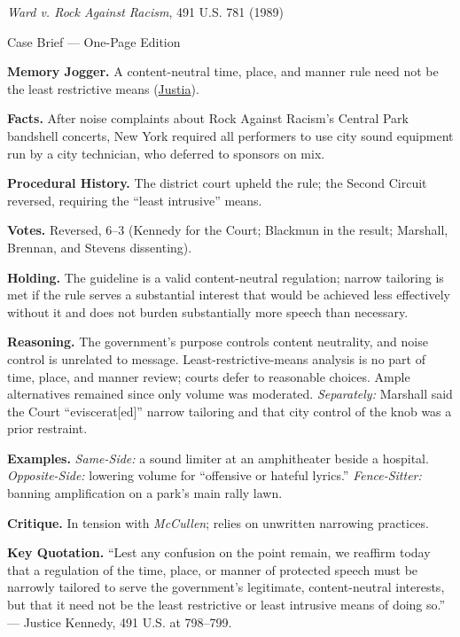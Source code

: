 \documentclass[12pt]{article}
\begin{document}
\begin{center}
{\Large \textit{Ward v. Rock Against Racism}, 491 U.S. 781 (1989)\par}
\vspace{0.3em}
{\normalsize Case Brief --- One-Page Edition\par}
\end{center}

\textbf{Memory Jogger.} A content-neutral time, place, and manner rule need not be the least restrictive means (\href{https://supreme.justia.com/cases/federal/us/491/781/}{Justia}).

\textbf{Facts.} After noise complaints about Rock Against Racism's Central Park bandshell concerts, New York required all performers to use city sound equipment run by a city technician, who deferred to sponsors on mix.

\textbf{Procedural History.} The district court upheld the rule; the Second Circuit reversed, requiring the ``least intrusive'' means.

\textbf{Votes.} Reversed, 6--3 (Kennedy for the Court; Blackmun in the result; Marshall, Brennan, and Stevens dissenting).

\textbf{Holding.} The guideline is a valid content-neutral regulation; narrow tailoring is met if the rule serves a substantial interest that would be achieved less effectively without it and does not burden substantially more speech than necessary.

\textbf{Reasoning.} The government's purpose controls content neutrality, and noise control is unrelated to message. Least-restrictive-means analysis is no part of time, place, and manner review; courts defer to reasonable choices. Ample alternatives remained since only volume was moderated. \emph{Separately:} Marshall said the Court ``eviscerat[ed]'' narrow tailoring and that city control of the knob was a prior restraint.

\textbf{Examples.} \emph{Same-Side:} a sound limiter at an amphitheater beside a hospital. \emph{Opposite-Side:} lowering volume for ``offensive or hateful lyrics.'' \emph{Fence-Sitter:} banning amplification on a park's main rally lawn.

\textbf{Critique.} In tension with \textit{McCullen}; relies on unwritten narrowing practices.

\textbf{Key Quotation.} ``Lest any confusion on the point remain, we reaffirm today that a regulation of the time, place, or manner of protected speech must be narrowly tailored to serve the government's legitimate, content-neutral interests, but that it need not be the least restrictive or least intrusive means of doing so.'' --- Justice Kennedy, 491 U.S. at 798--799.
\end{document}
